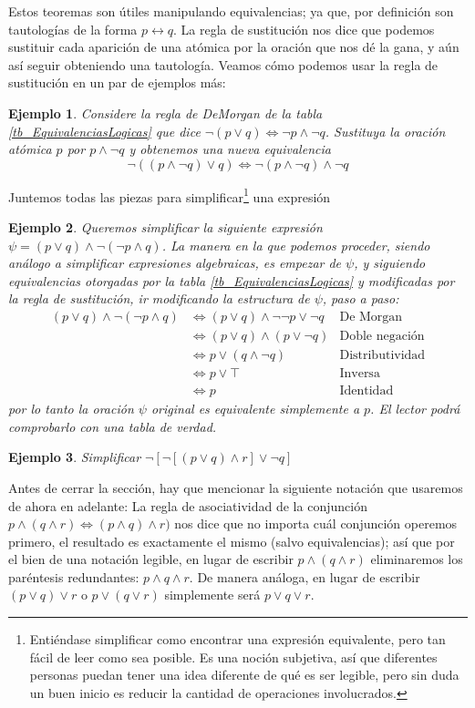 \documentclass{book}
\newtheorem*{ejm}{Ejemplo}
\begin{document}
Estos teoremas son útiles manipulando equivalencias; ya que, por definición son tautologías de la forma $p\leftrightarrow q$.
La regla de sustitución nos dice que podemos sustituir cada aparición de una atómica por la oración que nos dé la gana, y aún así seguir obteniendo una tautología.
Veamos cómo podemos usar la regla de sustitución en un par de ejemplos más:
\begin{ejm}
	Considere la regla de DeMorgan de la tabla \ref{tb_EquivalenciasLogicas} que dice $\neg(p \vee q) \iff \neg p \wedge \neg q$. Sustituya la oración atómica $p$ por $p\wedge \neg q$ y obtenemos una nueva equivalencia \[\neg ((p \wedge \neg q) \vee q) \iff \neg (p \wedge \neg q) \wedge \neg q\]
\end{ejm}
Juntemos todas las piezas para simplificar\footnote{Entiéndase simplificar como encontrar una expresión equivalente, pero tan fácil de leer como sea posible. Es una noción subjetiva, así que diferentes personas puedan tener una idea diferente de qué es ser legible, pero sin duda un buen inicio es reducir la cantidad de operaciones involucrados.} una expresión
\begin{ejm}
	Queremos simplificar la siguiente expresión $\psi = (p\vee q)\wedge \neg(\neg p \wedge q)$. La manera en la que podemos proceder, siendo análogo a simplificar expresiones algebraicas, es empezar de $\psi$, y siguiendo equivalencias otorgadas por la tabla \ref{tb_EquivalenciasLogicas} y modificadas por la regla de sustitución, ir modificando la estructura de $\psi$, paso a paso:
	\begin{align*}
		(p\vee q)\wedge \neg(\neg p \wedge q) & \iff (p \vee q)\wedge \neg \neg p \vee \neg q & \text{De Morgan}
		\\ & \iff (p \vee q)\wedge (p\vee \neg q) & \text{Doble negación}
		\\ & \iff p \vee (q \wedge \neg q) & \text{Distributividad}
		\\ & \iff p \vee \top & \text{Inversa}
		\\ & \iff p & \text{Identidad}
	\end{align*}
	por lo tanto la oración $\psi$ original es equivalente simplemente a $p$. El lector podrá comprobarlo con una tabla de verdad.
\end{ejm}
\begin{ejm}
	Simplificar $\neg \left[\neg \left[ (p\vee q)\wedge r\right]\vee \neg q \right]$ 
\end{ejm}
Antes de cerrar la sección, hay que mencionar la siguiente notación que usaremos de ahora en adelante:
La regla de asociatividad de la conjunción $p \wedge (q \wedge r) \iff (p \wedge q) \wedge r)$ nos dice que no importa cuál conjunción operemos primero, el resultado es exactamente el mismo (salvo equivalencias); así que por el bien de una notación legible, en lugar de escribir $p \wedge (q \wedge r)$ eliminaremos los paréntesis redundantes: $p \wedge q \wedge r$.
De manera análoga, en lugar de escribir $(p \vee q) \vee r$ o $p \vee (q \vee r)$ simplemente será $p\vee q \vee r$.
\end{document}

